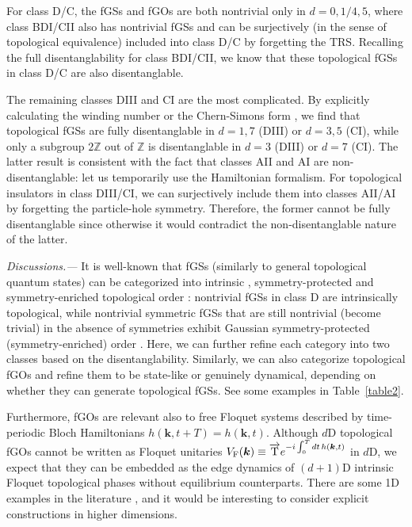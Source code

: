 \documentclass[prl,twocolumn,preprintnumbers,superscriptaddress,amsmath,amssymb]{revtex4-1}
\begin{document}
For class D/C, the fGSs and fGOs are both nontrivial only in $d=0,1/4,5$, where class BDI/CII also has nontrivial fGSs and can be surjectively (in the sense of topological equivalence) included into class D/C by forgetting the TRS. Recalling the full disentanglability for class BDI/CII, we know that these topological fGSs in class D/C are also disentanglable. 

The remaining classes DIII and CI are the most complicated. By explicitly calculating the winding number or the Chern-Simons form \cite{Ryu2016}, we find that topological fGSs are fully disentanglable in  $d=1,7$ (DIII) or $d=3,5$ (CI), while only a subgroup $2\mathbb{Z}$ out of $\mathbb{Z}$ is disentanglable in $d=3$ (DIII) or $d=7$ (CI). The latter result is consistent with the fact that classes AII and AI are non-disentanglable: let us temporarily use the Hamiltonian formalism. For topological insulators in class DIII/CI, we can surjectively include them into classes AII/AI by forgetting the particle-hole symmetry. Therefore, the former cannot be fully disentanglable since otherwise it would contradict the non-disentanglable nature of the latter.    



\emph{Discussions.---} It is well-known that fGSs (similarly to general topological quantum states) can be categorized into intrinsic \cite{Wen1990}, symmetry-protected \cite{Haldane1983} and symmetry-enriched topological order \cite{Ran2013}: nontrivial fGSs in class D are intrinsically topological, while nontrivial symmetric fGSs that are still nontrivial (become trivial) in the absence of symmetries exhibit Gaussian symmetry-protected (symmetry-enriched) order \cite{symc}. Here, we can further refine each category into two classes based on the disentanglability. Similarly, we can also categorize topological fGOs and refine them to be state-like or genuinely dynamical, depending on whether they can generate topological fGSs. See some examples in Table~\ref{table2}.


Furthermore, fGOs are relevant also to free Floquet systems described by time-periodic Bloch Hamiltonians $h(\boldsymbol{k},t+T)=h(\boldsymbol{k},t)$. Although $d$D topological fGOs cannot be written as Floquet unitaries $V_{\rm F}(\boldsymbol{k})\equiv\overrightarrow{\rm T} e^{-i\int^T_0dt \, h(\boldsymbol{k},t)}$ in $d$D, we expect that they can be embedded as the edge dynamics of $(d+1)$D intrinsic Floquet topological phases without equilibrium counterparts. There are some 1D examples in the literature \cite{Lindner2013,Fidkowski2019}, and it would be interesting to consider explicit constructions in higher dimensions. 
\end{document}
